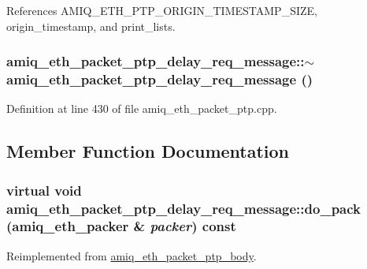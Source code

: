 References AMIQ\_\-ETH\_\-PTP\_\-ORIGIN\_\-TIMESTAMP\_\-SIZE, origin\_\-timestamp, and print\_\-lists.\hypertarget{classamiq__eth__packet__ptp__delay__req__message_a56dccff94f0c8618cc32e89cfbeff0f2}{
\subsubsection[{$\sim$amiq\_\-eth\_\-packet\_\-ptp\_\-delay\_\-req\_\-message}]{\setlength{\rightskip}{0pt plus 5cm}amiq\_\-eth\_\-packet\_\-ptp\_\-delay\_\-req\_\-message::$\sim$amiq\_\-eth\_\-packet\_\-ptp\_\-delay\_\-req\_\-message ()}}
\label{classamiq__eth__packet__ptp__delay__req__message_a56dccff94f0c8618cc32e89cfbeff0f2}


Definition at line 430 of file amiq\_\-eth\_\-packet\_\-ptp.cpp.

\subsection{Member Function Documentation}
\hypertarget{classamiq__eth__packet__ptp__delay__req__message_a746ff6b9bc45d17e7158525b6433f21a}{
\subsubsection[{do\_\-pack}]{\setlength{\rightskip}{0pt plus 5cm}virtual void amiq\_\-eth\_\-packet\_\-ptp\_\-delay\_\-req\_\-message::do\_\-pack ({\bf amiq\_\-eth\_\-packer} \& {\em packer}) const}}
\label{classamiq__eth__packet__ptp__delay__req__message_a746ff6b9bc45d17e7158525b6433f21a}


Reimplemented from \hyperlink{classamiq__eth__packet__ptp__body_a3df3ad9b3a4ef7ec42357565d44ede05}{amiq\_\-eth\_\-packet\_\-ptp\_\-body}.

